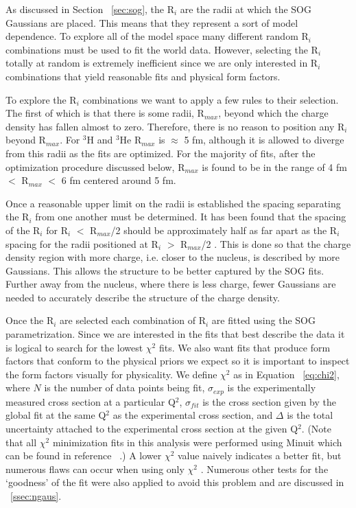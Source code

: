 As discussed in Section ~\ref{sec:sog}, the R$_i$ are the radii at which the SOG Gaussians are placed. This means that they represent a sort of model dependence. To explore all of the model space many different random R$_i$ combinations must be used to fit the world data. However, selecting the R$_i$ totally at random is extremely inefficient since we are only interested in R$_i$ combinations that yield reasonable fits and physical form factors. 

To explore the R$_i$ combinations we want to apply a few rules to their selection. The first of which is that there is some radii, R$_{max}$, beyond which the charge density has fallen almost to zero. Therefore, there is no reason to position any R$_i$ beyond R$_{max}$. For $^3$H and $^3$He R$_{max}$ is $\approx$ 5 fm, although it is allowed to diverge from this radii as the fits are optimized. For the majority of fits, after the optimization procedure discussed below, R$_{max}$ is found to be in the range of 4 fm $<$ R$_{max}$ $<$ 6 fm centered around 5 fm.

Once a reasonable upper limit on the radii is established the spacing separating the R$_i$ from one another must be determined. It has been found that the spacing of the R$_i$ for R$_i$ $<$ R$_{max}$/2 should be approximately half as far apart as the R$_i$ spacing for the radii positioned at R$_i$ $>$ R$_{max}$/2 \cite{Article:SOG}. This is done so that the charge density region with more charge, i.e. closer to the nucleus, is described by more Gaussians. This allows the structure to be better captured by the SOG fits. Further away from the nucleus, where there is less charge, fewer Gaussians are needed to accurately describe the structure of the charge density.   

Once the R$_i$ are selected each combination of R$_i$ are fitted using the SOG parametrization. Since we are interested in the fits that best describe the data it is logical to search for the lowest $\chi^2$ fits. We also want fits that produce form factors that conform to the physical priors we expect so it is important to inspect the form factors visually for physicality. We define $\chi^2$ as in Equation ~\ref{eq:chi2}, where $N$ is the number of data points being fit, $\sigma_{exp}$ is the experimentally measured cross section at a particular Q$^2$, $\sigma_{fit}$ is the cross section given by the global fit at the same Q$^2$ as the experimental cross section, and $\Delta$ is the total uncertainty attached to the experimental cross section at the given Q$^2$. (Note that all $\chi^2$ minimization fits in this analysis were performed using Minuit which can be found in reference ~\cite{minuit}.) A lower $\chi^2$ value naively indicates a better fit, but numerous flaws can occur when using only $\chi^2$ \cite{doug_stats}. Numerous other tests for the `goodness' of the fit were also applied to avoid this problem and are discussed in ~\ref{ssec:ngaus}.  

